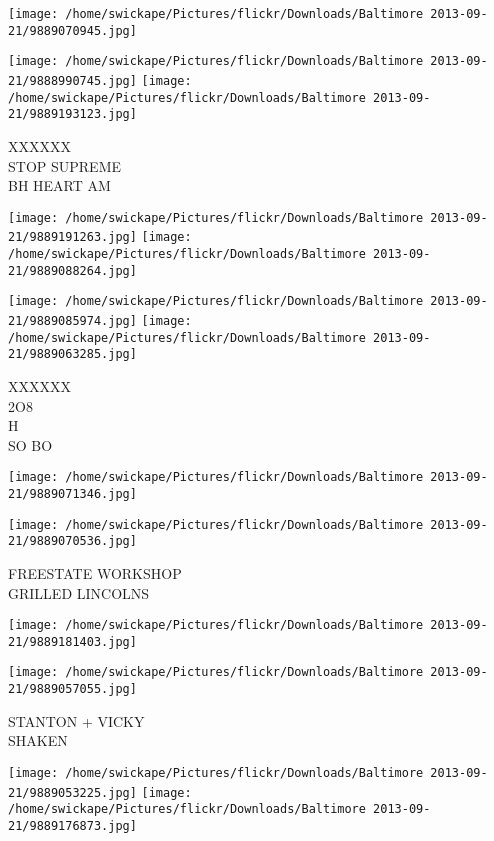 \documentclass[10pt,letterpaper]{article}
\begin{document}
\texttt{[image: /home/swickape/Pictures/flickr/Downloads/Baltimore 2013-09-21/9889070945.jpg]}

\vspace{0.25in}
\texttt{[image: /home/swickape/Pictures/flickr/Downloads/Baltimore 2013-09-21/9888990745.jpg]}
\texttt{[image: /home/swickape/Pictures/flickr/Downloads/Baltimore 2013-09-21/9889193123.jpg]}

XXXXXX\\
STOP SUPREME\\
BH HEART AM
\pagebreak

\texttt{[image: /home/swickape/Pictures/flickr/Downloads/Baltimore 2013-09-21/9889191263.jpg]}
\texttt{[image: /home/swickape/Pictures/flickr/Downloads/Baltimore 2013-09-21/9889088264.jpg]}

\texttt{[image: /home/swickape/Pictures/flickr/Downloads/Baltimore 2013-09-21/9889085974.jpg]}
\texttt{[image: /home/swickape/Pictures/flickr/Downloads/Baltimore 2013-09-21/9889063285.jpg]}

XXXXXX\\
2O8\\
H\\
SO BO
\pagebreak

\texttt{[image: /home/swickape/Pictures/flickr/Downloads/Baltimore 2013-09-21/9889071346.jpg]}

\vspace{0.25in}
\texttt{[image: /home/swickape/Pictures/flickr/Downloads/Baltimore 2013-09-21/9889070536.jpg]}

FREESTATE WORKSHOP\\
GRILLED LINCOLNS
\pagebreak

\texttt{[image: /home/swickape/Pictures/flickr/Downloads/Baltimore 2013-09-21/9889181403.jpg]}

\vspace{0.25in}
\texttt{[image: /home/swickape/Pictures/flickr/Downloads/Baltimore 2013-09-21/9889057055.jpg]}

STANTON + VICKY\\
SHAKEN
\pagebreak

\texttt{[image: /home/swickape/Pictures/flickr/Downloads/Baltimore 2013-09-21/9889053225.jpg]}
\texttt{[image: /home/swickape/Pictures/flickr/Downloads/Baltimore 2013-09-21/9889176873.jpg]}
\end{document}
